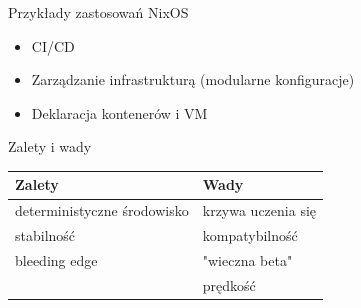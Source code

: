 \documentclass{beamer}
\begin{document}
\begin{frame}{Przykłady zastosowań NixOS}
    \begin{itemize}
        \item CI/CD
        \item Zarządzanie infrastrukturą (modularne konfiguracje)
        \item Deklaracja kontenerów i VM
    \end{itemize}
\end{frame}

\begin{frame}{Zalety i wady}
\begin{table}[]
    \begin{tabular}{|p{}|p{}|}
        \hline
        \textbf{Zalety} & \textbf{Wady} \\
        \hline
        deterministyczne środowisko & krzywa uczenia się \\
        stabilność                  & kompatybilność \\
        bleeding edge               & "wieczna beta" \\
                                    & prędkość \\
        \hline
    \end{tabular}
\end{table}
\end{frame}
\end{document}

